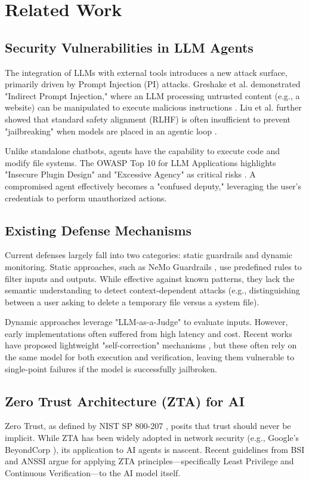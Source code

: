 \section{Related Work}

\subsection{Security Vulnerabilities in LLM Agents}
The integration of LLMs with external tools introduces a new attack surface, primarily driven by Prompt Injection (PI) attacks. Greshake et al. demonstrated "Indirect Prompt Injection," where an LLM processing untrusted content (e.g., a website) can be manipulated to execute malicious instructions \cite{greshake2023}. Liu et al. further showed that standard safety alignment (RLHF) is often insufficient to prevent "jailbreaking" when models are placed in an agentic loop \cite{liu2023}.

Unlike standalone chatbots, agents have the capability to execute code and modify file systems. The OWASP Top 10 for LLM Applications highlights "Insecure Plugin Design" and "Excessive Agency" as critical risks \cite{owasp2023}. A compromised agent effectively becomes a "confused deputy," leveraging the user's credentials to perform unauthorized actions.

\subsection{Existing Defense Mechanisms}
Current defenses largely fall into two categories: static guardrails and dynamic monitoring.
Static approaches, such as NeMo Guardrails \cite{nemo}, use predefined rules to filter inputs and outputs. While effective against known patterns, they lack the semantic understanding to detect context-dependent attacks (e.g., distinguishing between a user asking to delete a temporary file versus a system file).

Dynamic approaches leverage "LLM-as-a-Judge" to evaluate inputs. However, early implementations often suffered from high latency and cost. Recent works have proposed lightweight "self-correction" mechanisms \cite{pan2023}, but these often rely on the same model for both execution and verification, leaving them vulnerable to single-point failures if the model is successfully jailbroken.

\subsection{Zero Trust Architecture (ZTA) for AI}
Zero Trust, as defined by NIST SP 800-207 \cite{nist}, posits that trust should never be implicit. While ZTA has been widely adopted in network security (e.g., Google's BeyondCorp \cite{beyondcorp}), its application to AI agents is nascent.
Recent guidelines from BSI and ANSSI \cite{bsi_anssi} argue for applying ZTA principles---specifically Least Privilege and Continuous Verification---to the AI model itself.

